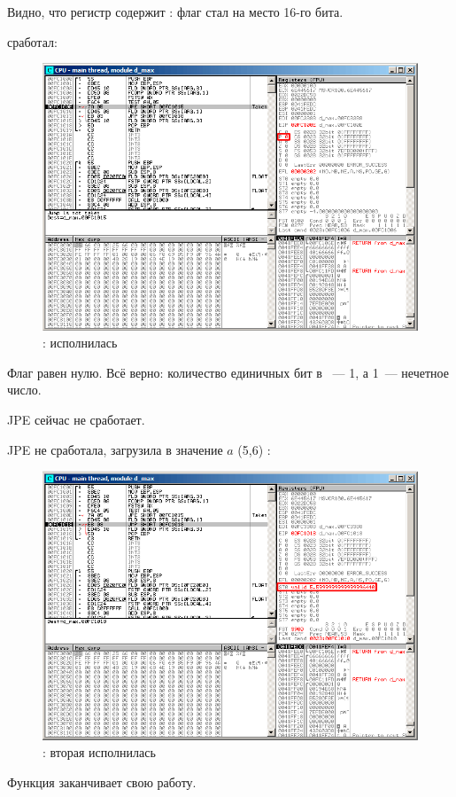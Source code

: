 Видно, что регистр  содержит : флаг \Czero стал на место 16-го бита.


\clearpage
\TEST сработал:

\begin{figure}[H]
\centering
\includegraphics[scale=\FigScale]{patterns/12_FPU/3_comparison/x86/MSVC/olly2_4.png}
\caption{\olly: \TEST исполнилась}
\label{fig:FPU_comparison_case2_olly4}
\end{figure}

Флаг  равен нулю.
Всё верно: 
количество единичных бит в ~--- 1, а 1~--- нечетное число.

\ac{JPE} сейчас не сработает.

\clearpage
\ac{JPE} не сработала,  \FLD 
загрузила в  значение $a$ (5,6)%
:

\begin{figure}[H]
\centering
\includegraphics[scale=\FigScale]{patterns/12_FPU/3_comparison/x86/MSVC/olly2_5.png}
\caption{\olly: вторая \FLD исполнилась}
\label{fig:FPU_comparison_case2_olly5}
\end{figure}

Функция заканчивает свою работу.
